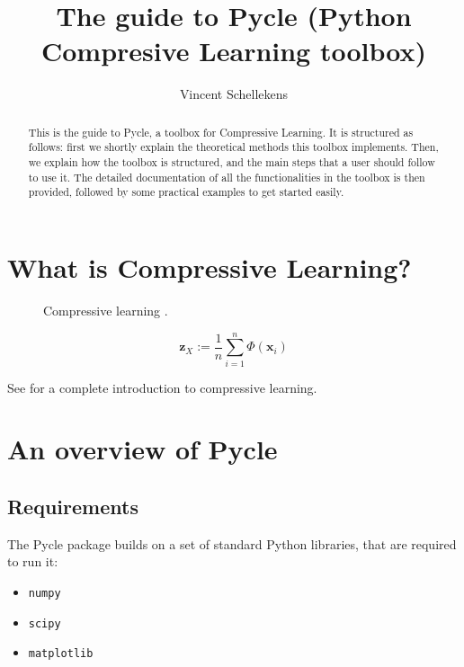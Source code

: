 \documentclass[]{article}
\title{The guide to Pycle (\textbf{Py}thon \textbf{C}ompresive \textbf{Le}arning toolbox)}
\author{Vincent Schellekens}
\newcommand{\code}{\texttt}
\renewcommand{\Vec}[1]{\bm{#1}} %
\begin{document}

\maketitle

\begin{abstract}
	This is the guide to Pycle, a toolbox for Compressive Learning. It is structured as follows: first we shortly explain the theoretical methods this toolbox implements. Then, we explain how the toolbox is structured, and the main steps that a user should follow to use it. The detailed documentation of all the functionalities in the toolbox is then provided, followed by some practical examples to get started easily.
\end{abstract}


\section{What is Compressive Learning?}


		
\begin{figure}[!htb]
	\centering
	\caption{Compressive learning .}
	\label{fig:CL}
	\end {figure}


\begin{equation}
\label{eq:sketching}
	\Vec{z}_X := \frac{1}{n} \sum_{i = 1}^n \Phi(\Vec{x}_i)
\end{equation}

See \cite{gribonval2017compressive} for a complete introduction to compressive learning.

\section{An overview of Pycle}


\subsection{Requirements}
The Pycle package builds on a set of standard Python libraries, that are required to run it: %
\begin{itemize}
	\item \code{numpy}
	\item \code{scipy}
	\item \code{matplotlib}
\end{itemize}
\end{document}
